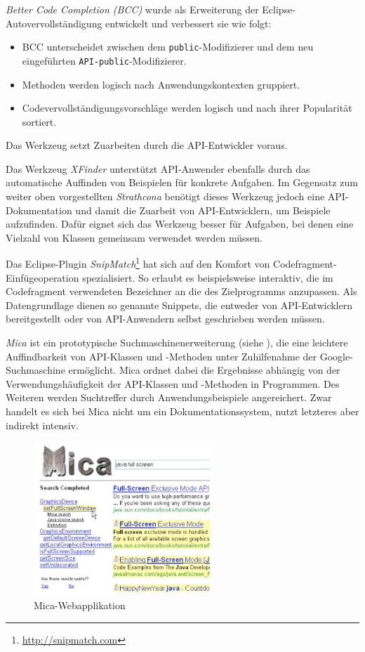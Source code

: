 \textit{Better Code Completion (BCC)} \citep{Hou:2010fd} wurde als Erweiterung der Eclipse-Autovervollständigung entwickelt und verbessert sie wie folgt:
\begin{itemize}
  \item BCC unterscheidet zwischen dem \texttt{public}-Modifizierer und dem neu eingeführten \texttt{API-public}-Modifizierer.
  \item Methoden werden logisch nach Anwendungskontexten gruppiert.
  \item Codevervollständigungsvorschläge werden logisch und nach ihrer Popularität sortiert.
\end{itemize}
Das Werkzeug setzt Zuarbeiten durch die API-Entwickler voraus.


Das Werkzeug \textit{XFinder} \citep{Dagenais:2008kj} unterstützt API-Anwender ebenfalls durch das automatische Auffinden von Beispielen für konkrete Aufgaben. Im Gegensatz zum weiter oben vorgestellten \textit{Strathcona} benötigt dieses Werkzeug jedoch eine API-Dokumentation und damit die Zuarbeit von API-Entwicklern, um Beispiele aufzufinden. Dafür eignet sich das Werkzeug besser für Aufgaben, bei denen eine Vielzahl von Klassen gemeinsam verwendet werden müssen.


Das Eclipse-Plugin \textit{SnipMatch}\footnote{\url{http://snipmatch.com}} \citep{Wightman:2012gc} hat sich auf den Komfort von Codefragment-Einfügeoperation spezialisiert. So erlaubt es beispielsweise interaktiv, die im Codefragment verwendeten Bezeichner an die des Zielprogramms anzupassen. Als Datengrundlage dienen so genannte Snippets, die entweder von API-Entwicklern bereitgestellt oder von API-Anwendern selbst geschrieben werden müssen.


\textit{Mica}\label{sec:mica} \citep{Stylos:2006gu} ist ein prototypische Suchmaschinenerweiterung (siehe ), die eine leichtere Auffindbarkeit von API-Klassen und -Methoden unter Zuhilfenahme der Google-Suchmaschine ermöglicht. Mica ordnet dabei die Ergebnisse abhängig von der Verwendungshäufigkeit der API-Klassen und -Methoden in Programmen. Des Weiteren werden Suchtreffer durch Anwendungsbeispiele angereichert. Zwar handelt es sich bei Mica nicht um ein Dokumentationssystem, nutzt letzteres aber indirekt intensiv.

\begin{figure}[ht!]
  \centering
    \includegraphics[width=0.6\textwidth]{Figures/tools/mica.png}
  \caption{Mica-Webapplikation \citep{Stylos:2006gu}}
  \label{fig:mica}
\end{figure}


